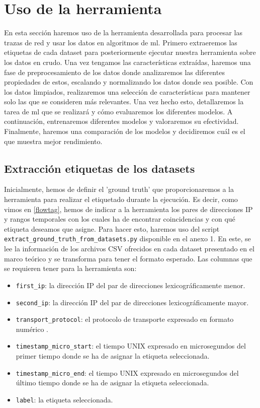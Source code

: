\section{Uso de la herramienta}

En esta sección haremos uso de la herramienta desarrollada para procesar las trazas de red y usar los datos en algoritmos de \gls{ml}. Primero extraeremos las etiquetas de cada dataset para posteriormente ejecutar nuestra herramienta sobre los datos en crudo. Una vez tengamos las características extraídas, haremos una fase de preprocesamiento de los datos donde analizaremos las diferentes propiedades de estos, escalando y normalizando los datos donde sea posible. Con los datos limpiados, realizaremos una selección de características para mantener solo las que se consideren más relevantes. Una vez hecho esto, detallaremos la tarea de \gls{ml} que se realizará y cómo evaluaremos los diferentes modelos. A continuación, entrenaremos diferentes modelos y valoraremos su efectividad. Finalmente, haremos una comparación de los modelos y decidiremos cuál es el que muestra mejor rendimiento.

\subsection{Extracción etiquetas de los datasets}

Inicialmente, hemos de definir el 'ground truth' que proporcionaremos a la herramienta para realizar el etiquetado durante la ejecución. Es decir, como vimos en \ref{flowtag}, hemos de indicar a la herramienta los pares de direcciones IP y rangos temporales con los cuales ha de encontrar coincidencias y con qué etiqueta deseamos que asigne. Para hacer esto, haremos uso del script \texttt{extract\-\_ground\-\_truth\-\_from\-\_datasets.py} disponible en el anexo 1. En este, se lee la información de los archivos CSV ofrecidos en cada dataset presentado en el marco teórico y se transforma para tener el formato esperado. Las columnas que se requieren tener para la herramienta son:

\begin{itemize}
    \item \texttt{first\_ip}: la dirección IP del par de direcciones lexicográficamente menor.
    \item \texttt{second\_ip}: la dirección IP del par de direcciones lexicográficamente mayor.
    \item \texttt{transport\_protocol}: el protocolo de transporte expresado en formato numérico \cite{ipprotocolnumbers}.
    \item \texttt{timestamp\_micro\_start}: el tiempo UNIX expresado en microsegundos del primer tiempo donde se ha de asignar la etiqueta seleccionada.
    \item \texttt{timestamp\_micro\_end}:  el tiempo UNIX expresado en microsegundos del último tiempo donde se ha de asignar la etiqueta seleccionada.
    \item \texttt{label}: la etiqueta seleccionada.
\end{itemize}

